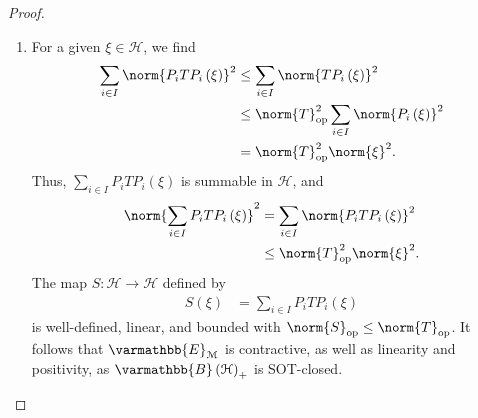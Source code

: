 \documentclass[10pt]{mypackage}
\renewcommand*{\mathbb}[1]{\varmathbb{#1}}
\newcommand{\B}{\mathbb{B}}
\begin{document}
\begin{proof}\hfill
  \begin{enumerate}[(1)]
    \item For a given $\xi\in \mathcal{H}$, we find
      \begin{align*}
        \sum_{i\in I}\norm{P_iTP_i\left(\xi\right)}^2 &\leq \sum_{i\in I}\norm{TP_i\left(\xi\right)}^2\\
                                                      &\leq \norm{T}_{\text{op}}^2\sum_{i\in I}\norm{P_i\left(\xi\right)}^2\\
                                                      &= \norm{T}_{\text{op}}^2\norm{\xi}^2.
      \end{align*}
      Thus, $\sum_{i\in I}P_iTP_i\left(\xi\right)$ is summable in $\mathcal{H}$, and
      \begin{align*}
        \norm{\sum_{i\in I}P_iTP_i\left(\xi\right)}^2 &= \sum_{i\in I}\norm{P_iTP_i\left(\xi\right)}^2\\
                                                      &\leq \norm{T}_{\text{op}}^2\norm{\xi}^2.
      \end{align*}
      The map $S\colon \mathcal{H}\rightarrow \mathcal{H}$ defined by
      \begin{align*}
        S\left(\xi\right) &= \sum_{i\in I}P_iTP_i\left(\xi\right)
      \end{align*}
      is well-defined, linear, and bounded with $\norm{S}_{\text{op}}\leq \norm{T}_{\text{op}}$. It follows that $\mathbb{E}_{\mathcal{M}}$ is contractive, as well as linearity and positivity, as $\B\left(\mathcal{H}\right)_{+}$ is SOT-closed.\newline


\end{enumerate}
\end{proof}
\end{document}

